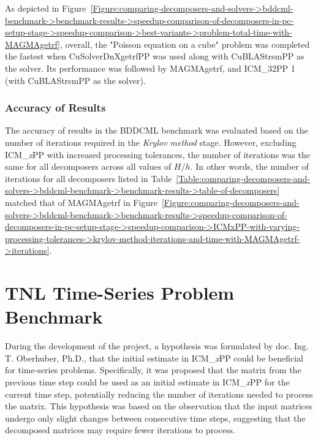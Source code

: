 As depicted in Figure~\ref{Figure:comparing-decomposers-and-solvers->bddcml-benchmark->benchmark-results->speedup-comparison-of-decomposers-in-pc-setup-stage->speedup-comparison->best-variants->problem-total-time-with-MAGMAgetrf}, overall, the "Poisson equation on a cube" problem was completed the fastest when CuSolverDnXgetrfPP was used along with CuBLAStrsmPP as the solver.
Its performance was followed by MAGMAgetrf, and ICM\_32PP 1 (with CuBLAStrsmPP as the solver).

\subsubsection{Accuracy of Results} The accuracy of results in the BDDCML benchmark was evaluated based on the number of iterations required in the \textit{Krylov method} stage.
However, excluding ICM\_\textit{x}PP with increased processing tolerances, the number of iterations was the same for all decomposers across all values of $H/h$.
In other words, the number of iterations for all decomposers listed in Table~\ref{Table:comparing-decomposers-and-solvers->bddcml-benchmark->benchmark-results->table-of-decomposers} matched that of MAGMAgetrf in Figure~\ref{Figure:comparing-decomposers-and-solvers->bddcml-benchmark->benchmark-results->speedup-comparison-of-decomposers-in-pc-setup-stage->speedup-comparison->ICMxPP-with-varying-processing-tolerances->krylov-method-iterations-and-time-with-MAGMAgetrf->iterations}.




\section{TNL Time-Series Problem Benchmark}\label{Section:comparing-decomposers-and-solvers->tnl-time-series-problem-benchmark}
During the development of the project, a hypothesis was formulated by doc. Ing. T. Oberhuber, Ph.D., that the initial estimate in ICM\_\textit{x}PP could be beneficial for time-series problems.
Specifically, it was proposed that the  matrix from the previous time step could be used as an initial estimate in ICM\_\textit{x}PP for the current time step, potentially reducing the number of iterations needed to process the matrix.
This hypothesis was based on the observation that the input matrices undergo only slight changes between consecutive time steps, suggesting that the decomposed matrices may require fewer iterations to process.


